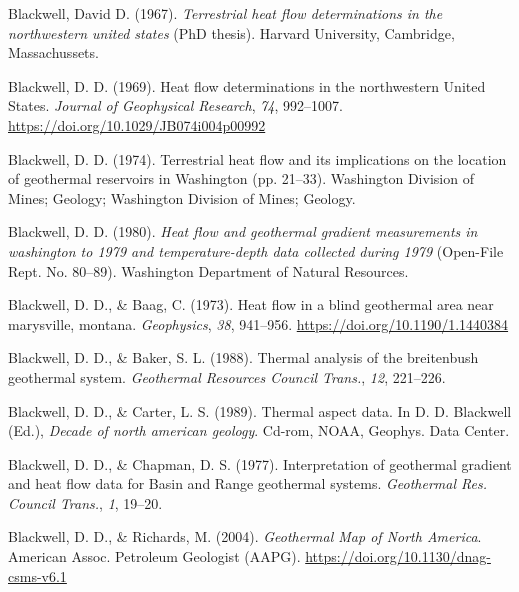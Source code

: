 \documentclass[draft,linenumbers]{agujournal2018}
\begin{document}
\leavevmode{}%
Blackwell, David D. (1967). \emph{Terrestrial heat flow determinations
in the northwestern united states} (PhD thesis). Harvard University,
Cambridge, Massachussets.

\leavevmode{}%
Blackwell, D. D. (1969). Heat flow determinations in the northwestern
{United States}. \emph{Journal of Geophysical Research}, \emph{74},
992--1007. \url{https://doi.org/10.1029/JB074i004p00992}

\leavevmode{}%
Blackwell, D. D. (1974). Terrestrial heat flow and its implications on
the location of geothermal reservoirs in {Washington} (pp. 21--33).
Washington Division of Mines; Geology; Washington Division of Mines;
Geology.

\leavevmode{}%
Blackwell, D. D. (1980). \emph{Heat flow and geothermal gradient
measurements in washington to 1979 and temperature-depth data collected
during 1979} (Open-File Rept. No. 80--89). Washington Department of
Natural Resources.

\leavevmode{}%
Blackwell, D. D., \& Baag, C. (1973). Heat flow in a blind geothermal
area near marysville, montana. \emph{{Geophysics}}, \emph{38}, 941--956.
\url{https://doi.org/10.1190/1.1440384}

\leavevmode{}%
Blackwell, D. D., \& Baker, S. L. (1988). Thermal analysis of the
breitenbush geothermal system. \emph{Geothermal Resources Council
Trans.}, \emph{12}, 221--226.

\leavevmode{}%
Blackwell, D. D., \& Carter, L. S. (1989). Thermal aspect data. In D. D.
Blackwell (Ed.), \emph{Decade of north american geology}. Cd-rom, NOAA,
Geophys. Data Center.

\leavevmode{}%
Blackwell, D. D., \& Chapman, D. S. (1977). Interpretation of geothermal
gradient and heat flow data for {Basin and Range} geothermal systems.
\emph{Geothermal Res. Council Trans.}, \emph{1}, 19--20.

\leavevmode{}%
Blackwell, D. D., \& Richards, M. (2004). \emph{{Geothermal Map of North
America}}. American Assoc. Petroleum Geologist (AAPG).
\url{https://doi.org/10.1130/dnag-csms-v6.1}
\end{document}
